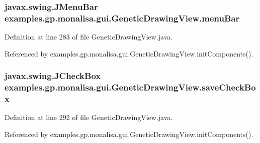\hypertarget{classexamples_1_1gp_1_1monalisa_1_1gui_1_1_genetic_drawing_view_aa4693a74c3b7af1f57f4cfbe88f4f9b0}{
\subsubsection[{menu\-Bar}]{\setlength{\rightskip}{0pt plus 5cm}javax.\-swing.\-J\-Menu\-Bar examples.\-gp.\-monalisa.\-gui.\-Genetic\-Drawing\-View.\-menu\-Bar\hspace{0.3cm}{\ttfamily [private]}}}\label{classexamples_1_1gp_1_1monalisa_1_1gui_1_1_genetic_drawing_view_aa4693a74c3b7af1f57f4cfbe88f4f9b0}


Definition at line 283 of file Genetic\-Drawing\-View.\-java.



Referenced by examples.\-gp.\-monalisa.\-gui.\-Genetic\-Drawing\-View.\-init\-Components().

\hypertarget{classexamples_1_1gp_1_1monalisa_1_1gui_1_1_genetic_drawing_view_a8b2837e508c508a09e93805f90b57f91}{
\subsubsection[{save\-Check\-Box}]{\setlength{\rightskip}{0pt plus 5cm}javax.\-swing.\-J\-Check\-Box examples.\-gp.\-monalisa.\-gui.\-Genetic\-Drawing\-View.\-save\-Check\-Box\hspace{0.3cm}{\ttfamily [private]}}}\label{classexamples_1_1gp_1_1monalisa_1_1gui_1_1_genetic_drawing_view_a8b2837e508c508a09e93805f90b57f91}


Definition at line 292 of file Genetic\-Drawing\-View.\-java.



Referenced by examples.\-gp.\-monalisa.\-gui.\-Genetic\-Drawing\-View.\-init\-Components().

